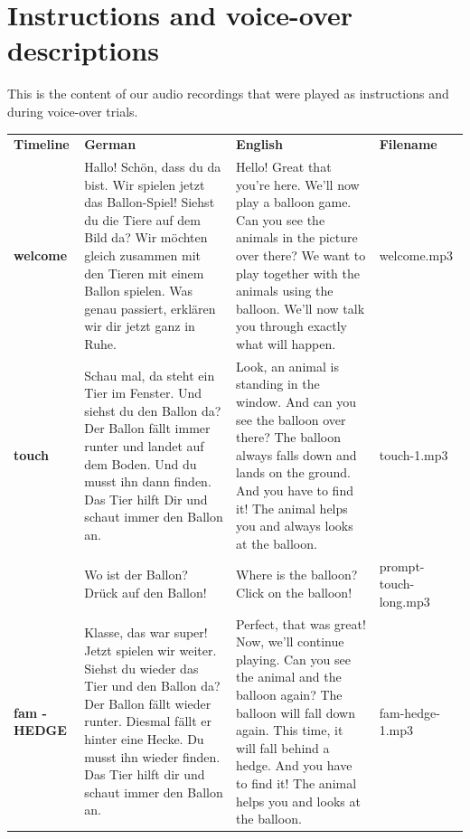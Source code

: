 \documentclass[
  man,floatsintext]{apa6}
\begin{document}
\hypertarget{instructions-and-voice-over-descriptions}{%
\section{Instructions and voice-over descriptions}\label{instructions-and-voice-over-descriptions}}

This is the content of our audio recordings that were played as instructions and during voice-over trials.

\begin{longtable}[]{@{}
  >{\raggedright\arraybackslash}p{}
  >{\raggedright\arraybackslash}p{}
  >{\raggedright\arraybackslash}p{}
  >{\raggedright\arraybackslash}p{}@{}}
\toprule()
\endhead
\textbf{Timeline} & \textbf{German} & \textbf{English} & \textbf{Filename} \\
\textbf{welcome} & Hallo! Schön, dass du da bist. Wir spielen jetzt das Ballon-Spiel! Siehst du die Tiere auf dem Bild da? Wir möchten gleich zusammen mit den Tieren mit einem Ballon spielen. Was genau passiert, erklären wir dir jetzt ganz in Ruhe. & Hello! Great that you're here. We'll now play a balloon game. Can you see the animals in the picture over there? We want to play together with the animals using the balloon. We'll now talk you through exactly what will happen. & welcome.mp3 \\
\textbf{touch} & Schau mal, da steht ein Tier im Fenster. Und siehst du den Ballon da? Der Ballon fällt immer runter und landet auf dem Boden. Und du musst ihn dann finden. Das Tier hilft Dir und schaut immer den Ballon an. & Look, an animal is standing in the window. And can you see the balloon over there? The balloon always falls down and lands on the ground. And you have to find it! The animal helps you and always looks at the balloon. & touch-1.mp3 \\
& Wo ist der Ballon? Drück auf den Ballon! & Where is the balloon? Click on the balloon! & prompt-touch-long.mp3 \\
\textbf{fam - HEDGE} & Klasse, das war super! Jetzt spielen wir weiter. Siehst du wieder das Tier und den Ballon da? Der Ballon fällt wieder runter. Diesmal fällt er hinter eine Hecke. Du musst ihn wieder finden. Das Tier hilft dir und schaut immer den Ballon an. & Perfect, that was great! Now, we'll continue playing. Can you see the animal and the balloon again? The balloon will fall down again. This time, it will fall behind a hedge. And you have to find it! The animal helps you and looks at the balloon. & fam-hedge-1.mp3 \\

\end{longtable}
\end{document}
